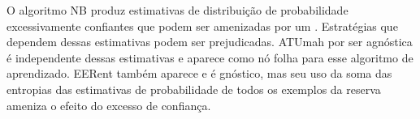 O algoritmo NB produz estimativas de distribuição de probabilidade excessivamente confiantes
que podem ser amenizadas por um  \citep{conf/icml/RoyM01}.
Estratégias que dependem dessas estimativas podem ser prejudicadas.
ATUmah por ser agnóstica é independente dessas estimativas e aparece como nó
folha para esse algoritmo de aprendizado.
EERent também aparece e é gnóstico,
mas seu uso da soma das entropias das estimativas de
probabilidade de todos os exemplos da reserva ameniza o efeito do excesso de confiança.

% 

